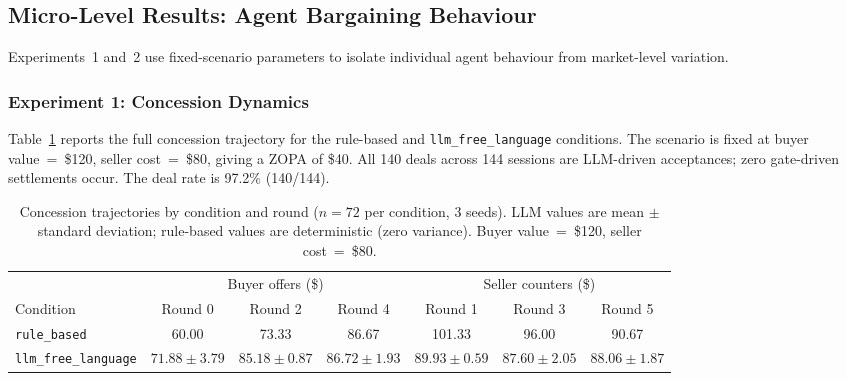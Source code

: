 
\subsection{Micro-Level Results: Agent Bargaining Behaviour}
\label{sec:results-micro}

Experiments~1 and~2 use fixed-scenario parameters to isolate individual agent behaviour from market-level variation.

\subsubsection{Experiment 1: Concession Dynamics}
\label{sec:results-concession}

Table~\ref{tab:concession} reports the full concession trajectory for the rule-based and \texttt{llm\_free\_language} conditions.  The scenario is fixed at buyer value~=~\$120, seller cost~=~\$80, giving a ZOPA of \$40.  All 140 deals across 144 sessions are LLM-driven acceptances; zero gate-driven settlements occur.  The deal rate is 97.2\% (140/144).

\begin{table}[ht]
\centering
\caption{Concession trajectories by condition and round ($n = 72$ per condition, 3 seeds).  LLM values are mean $\pm$ standard deviation; rule-based values are deterministic (zero variance).  Buyer value~=~\$120, seller cost~=~\$80.}
\label{tab:concession}
\begin{tabular}{@{}lcccccc@{}}
\toprule
 & \multicolumn{3}{c}{Buyer offers (\$)} & \multicolumn{3}{c}{Seller counters (\$)} \\
\cmidrule(lr){2-4}\cmidrule(lr){5-7}
Condition & Round 0 & Round 2 & Round 4 & Round 1 & Round 3 & Round 5 \\
\midrule
\texttt{rule\_based}       & 60.00 & 73.33 & 86.67 & 101.33 & 96.00 & 90.67 \\
\texttt{llm\_free\_language} & $71.88 \pm 3.79$ & $85.18 \pm 0.87$ & $86.72 \pm 1.93$ & $89.93 \pm 0.59$ & $87.60 \pm 2.05$ & $88.06 \pm 1.87$ \\
\bottomrule
\end{tabular}
\end{table}

